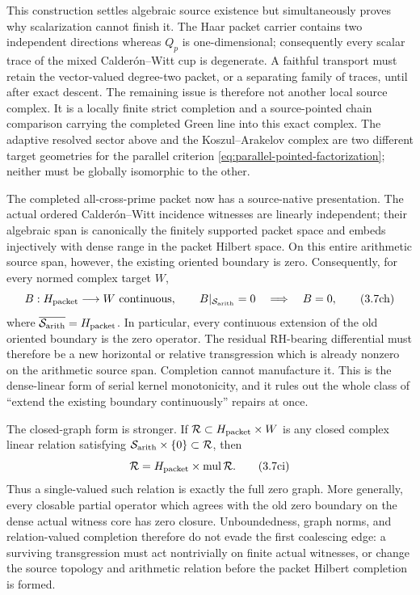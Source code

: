 \documentclass[11pt]{article}
\theoremstyle{definition}
\theoremstyle{remark}
\newcommand{\mul}{\operatorname{mul}}
\begin{document}
This construction settles algebraic source existence but simultaneously
proves why scalarization cannot finish it.  The Haar packet carrier contains
two independent directions whereas \(Q_p\) is one-dimensional; consequently
every scalar trace of the mixed Calder\'on--Witt cup is degenerate.  A
faithful transport must retain the vector-valued degree-two packet, or a
separating family of traces, until after exact descent.  The remaining issue
is therefore not another local source complex.  It is a locally finite strict
completion and a source-pointed chain comparison carrying the completed
Green line into this exact complex.  The adaptive resolved sector above and
the Koszul--Arakelov complex are two different target geometries for the
parallel criterion \eqref{eq:parallel-pointed-factorization}; neither must be
globally isomorphic to the other.

The completed all-cross-prime packet now has a source-native presentation.
The actual ordered Calder\'on--Witt incidence witnesses are linearly
independent; their algebraic span is canonically the finitely supported
packet space and embeds injectively with dense range in the packet Hilbert
space.  On this entire arithmetic source span, however, the existing
oriented boundary is zero.  Consequently, for every normed complex target \(W\),
\[
 B:H_{\rm packet}\longrightarrow W\ \hbox{continuous},\qquad
 B|_{\mathcal S_{\rm arith}}=0
 \quad\Longrightarrow\quad B=0,
\tag{3.7ch}\label{eq:dense-source-boundary-zero}
\]
where \(\overline{\mathcal S_{\rm arith}}=H_{\rm packet}\).  In particular,
every continuous extension of the old oriented boundary is the zero
operator.  The residual RH-bearing differential must therefore be a new
horizontal or relative transgression which is already nonzero on the
arithmetic source span.  Completion cannot manufacture it.  This is the
dense-linear form of serial kernel monotonicity, and it rules out the whole
class of ``extend the existing boundary continuously'' repairs at once.

The closed-graph form is stronger.  If
\(\mathcal R\subset H_{\rm packet}\times W\) is any closed complex linear
relation satisfying
\(\mathcal S_{\rm arith}\times\{0\}\subset\mathcal R\), then
\[
        \mathcal R
        =H_{\rm packet}\times\mul\mathcal R.
\tag{3.7ci}\label{eq:cross-prime-closed-relation-saturation}
\]
Thus a single-valued such relation is exactly the full zero graph.  More
generally, every closable partial operator which agrees with the old zero
boundary on the dense actual witness core has zero closure.  Unboundedness,
graph norms, and relation-valued completion therefore do not evade the
first coalescing edge: a surviving transgression must act nontrivially on
finite actual witnesses, or change the source topology and arithmetic
relation before the packet Hilbert completion is formed.
\end{document}
